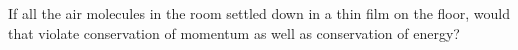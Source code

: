If all the air molecules in the room settled down in a thin film on the floor,
would that violate conservation of momentum as well as conservation of energy?

